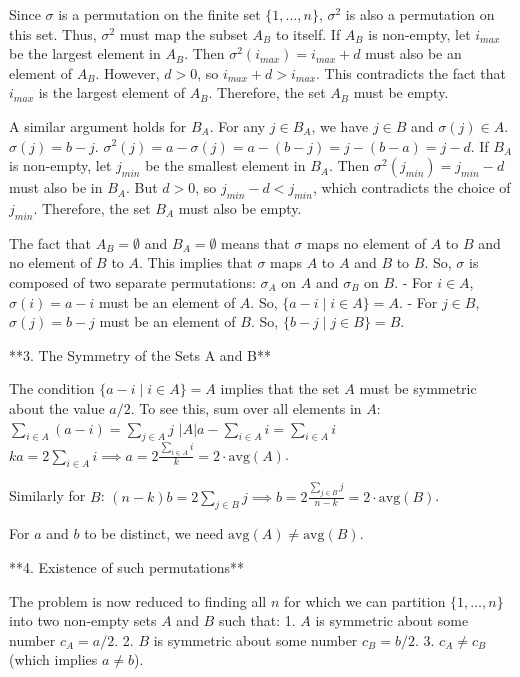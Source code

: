 Since $\sigma$ is a permutation on the finite set $\{1, \dots, n\}$, $\sigma^2$ is also a permutation on this set. Thus, $\sigma^2$ must map the subset $A_B$ to itself.
If $A_B$ is non-empty, let $i_{max}$ be the largest element in $A_B$.
Then $\sigma^2(i_{max}) = i_{max} + d$ must also be an element of $A_B$.
However, $d>0$, so $i_{max} + d > i_{max}$. This contradicts the fact that $i_{max}$ is the largest element of $A_B$.
Therefore, the set $A_B$ must be empty.

A similar argument holds for $B_A$. For any $j \in B_A$, we have $j \in B$ and $\sigma(j) \in A$.
$\sigma(j) = b-j$.
$\sigma^2(j) = a - \sigma(j) = a - (b-j) = j - (b-a) = j-d$.
If $B_A$ is non-empty, let $j_{min}$ be the smallest element in $B_A$.
Then $\sigma^2(j_{min}) = j_{min} - d$ must also be in $B_A$.
But $d>0$, so $j_{min}-d < j_{min}$, which contradicts the choice of $j_{min}$.
Therefore, the set $B_A$ must also be empty.

The fact that $A_B=\emptyset$ and $B_A=\emptyset$ means that $\sigma$ maps no element of $A$ to $B$ and no element of $B$ to $A$.
This implies that $\sigma$ maps $A$ to $A$ and $B$ to $B$.
So, $\sigma$ is composed of two separate permutations: $\sigma_A$ on $A$ and $\sigma_B$ on $B$.
- For $i \in A$, $\sigma(i) = a-i$ must be an element of $A$. So, $\{a-i \mid i \in A\} = A$.
- For $j \in B$, $\sigma(j) = b-j$ must be an element of $B$. So, $\{b-j \mid j \in B\} = B$.

**3. The Symmetry of the Sets A and B**

The condition $\{a-i \mid i \in A\} = A$ implies that the set $A$ must be symmetric about the value $a/2$.
To see this, sum over all elements in $A$:
$\sum_{i \in A} (a-i) = \sum_{j \in A} j$
$|A|a - \sum_{i \in A} i = \sum_{i \in A} i$
$ka = 2 \sum_{i \in A} i \implies a = 2 \frac{\sum_{i \in A} i}{k} = 2 \cdot \text{avg}(A)$.

Similarly for $B$:
$(n-k)b = 2 \sum_{j \in B} j \implies b = 2 \frac{\sum_{j \in B} j}{n-k} = 2 \cdot \text{avg}(B)$.

For $a$ and $b$ to be distinct, we need $\text{avg}(A) \ne \text{avg}(B)$.

**4. Existence of such permutations**

The problem is now reduced to finding all $n$ for which we can partition $\{1, \dots, n\}$ into two non-empty sets $A$ and $B$ such that:
1. $A$ is symmetric about some number $c_A = a/2$.
2. $B$ is symmetric about some number $c_B = b/2$.
3. $c_A \ne c_B$ (which implies $a \ne b$).

